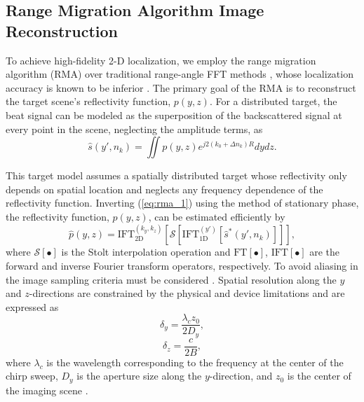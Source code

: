 \documentclass[10pt,journal,final]{IEEEtran}
\begin{document}
\subsection{Range Migration Algorithm Image Reconstruction}
\label{subsec:rma}
To achieve high-fidelity 2-D localization, we employ the range migration algorithm (RMA) over traditional range-angle FFT methods \cite{rao2017intro, kim2020aziumth}, whose localization accuracy is known to be inferior \cite{kim2018joint}. 
The primary goal of the RMA is to reconstruct the target scene's reflectivity function, $p(y,z)$.
For a distributed target, the beat signal can be modeled as the superposition of the backscattered signal at every point in the scene, neglecting the amplitude terms, as
\begin{equation}
	\label{eq:rma_1}
	\hat{s}(y',n_k) = \iint p(y,z) e^{j2(k_0 + \Delta n_k)R}dydz.
\end{equation}

This target model assumes a spatially distributed target whose reflectivity only depends on spatial location and neglects any frequency dependence of the reflectivity function. 
Inverting (\ref{eq:rma_1}) using the method of stationary phase, the reflectivity function, $p(y,z)$, can be estimated efficiently by
\begin{equation}
	\label{eq:rma_summary}
	\hat{p}(y,z) = \text{IFT}_{\text{2D}}^{(k_y,k_z)}\left[ \mathcal{S}\left[ \text{IFT}_{\text{1D}}^{(y')}[\hat{s}^*(y',n_k)] \right] \right],
\end{equation}
where $\mathcal{S}[\bullet]$ is the Stolt interpolation operation \cite{yanik2020development} and $\text{FT}[\bullet]$, $\text{IFT}[\bullet]$ are the forward and inverse Fourier transform operators, respectively. 
To avoid aliasing in the image sampling criteria must be considered \cite{yanik2019sparse}. Spatial resolution along the $y$ and $z$-directions are constrained by the physical and device limitations and are expressed as 
\begin{equation}
    \label{eq:y_res}
    \delta_y = \frac{\lambda_c z_0}{2 D_y},
\end{equation}
\begin{equation}
    \label{eq:z_res}
    \delta_z = \frac{c}{2 B},
\end{equation}
where $\lambda_c$ is the wavelength corresponding to the frequency at the center of the chirp sweep, $D_y$ is the aperture size along the $y$-direction, and $z_0$ is the center of the imaging scene \cite{yanik2019sparse}.
\end{document}
